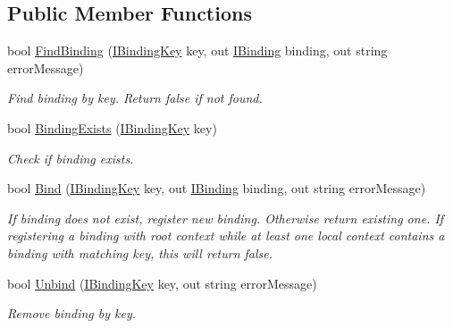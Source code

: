 \subsection*{Public Member Functions}
\begin{DoxyCompactItemize}
\item 
bool \mbox{\hyperlink{classcp_games_1_1core_1_1_rapid_m_v_c_1_1impl_1_1_binding_collection_a8678a2a0afd24bc6137ec2a44eea6cea}{Find\+Binding}} (\mbox{\hyperlink{interfacecp_games_1_1core_1_1_rapid_m_v_c_1_1_i_binding_key}{I\+Binding\+Key}} key, out \mbox{\hyperlink{interfacecp_games_1_1core_1_1_rapid_m_v_c_1_1_i_binding}{I\+Binding}} binding, out string error\+Message)
\begin{DoxyCompactList}\small\item\em Find binding by key. Return false if not found. \end{DoxyCompactList}\item 
bool \mbox{\hyperlink{classcp_games_1_1core_1_1_rapid_m_v_c_1_1impl_1_1_binding_collection_a0ea0895570b8a80afacfe4786df4954b}{Binding\+Exists}} (\mbox{\hyperlink{interfacecp_games_1_1core_1_1_rapid_m_v_c_1_1_i_binding_key}{I\+Binding\+Key}} key)
\begin{DoxyCompactList}\small\item\em Check if binding exists. \end{DoxyCompactList}\item 
bool \mbox{\hyperlink{classcp_games_1_1core_1_1_rapid_m_v_c_1_1impl_1_1_binding_collection_aac34e91512dc87adf4cfd7196093dd5b}{Bind}} (\mbox{\hyperlink{interfacecp_games_1_1core_1_1_rapid_m_v_c_1_1_i_binding_key}{I\+Binding\+Key}} key, out \mbox{\hyperlink{interfacecp_games_1_1core_1_1_rapid_m_v_c_1_1_i_binding}{I\+Binding}} binding, out string error\+Message)
\begin{DoxyCompactList}\small\item\em If binding does not exist, register new binding. Otherwise return existing one. If registering a binding with root context while at least one local context contains a binding with matching key, this will return false. \end{DoxyCompactList}\item 
bool \mbox{\hyperlink{classcp_games_1_1core_1_1_rapid_m_v_c_1_1impl_1_1_binding_collection_a86fc516a730e0862d18c5a9cfb561f3c}{Unbind}} (\mbox{\hyperlink{interfacecp_games_1_1core_1_1_rapid_m_v_c_1_1_i_binding_key}{I\+Binding\+Key}} key, out string error\+Message)
\begin{DoxyCompactList}\small\item\em Remove binding by key. \end{DoxyCompactList}\item 

\end{DoxyCompactItemize}
